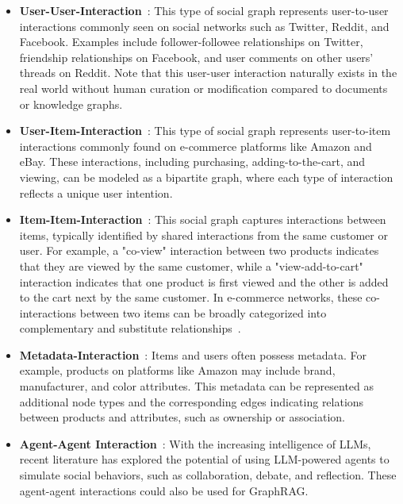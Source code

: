 \begin{itemize}[leftmargin=*]
    \item \textbf{User-User-Interaction}~\cite{jiang2023social}: This type of social graph represents user-to-user interactions commonly seen on social networks such as Twitter, Reddit, and Facebook. Examples include follower-followee relationships on Twitter, friendship relationships on Facebook, and user comments on other users' threads on Reddit. Note that this user-user interaction naturally exists in the real world without human curation or modification compared to documents or knowledge graphs.

    \item \textbf{User-Item-Interaction}~\cite{wang2024knowledge2, wang2024augmenting, xie2023factual, kim2020retrieval}: This type of social graph represents user-to-item interactions commonly found on e-commerce platforms like Amazon and eBay. These interactions, including purchasing, adding-to-the-cart, and viewing, can be modeled as a bipartite graph, where each type of interaction reflects a unique user intention.

    \item \textbf{Item-Item-Interaction}~\cite{wang2024knowledge2, zhang2021learning, wu2024stark}: This social graph captures interactions between items, typically identified by shared interactions from the same customer or user. For example, a "co-view" interaction between two products indicates that they are viewed by the same customer, while a "view-add-to-cart" interaction indicates that one product is first viewed and the other is added to the cart next by the same customer. In e-commerce networks, these co-interactions between two items can be broadly categorized into complementary and substitute relationships~\cite{zhao2024recommender}.

    \item \textbf{Metadata-Interaction}~\cite{wu2024stark, yang2024common}: Items and users often possess metadata. For example, products on platforms like Amazon may include brand, manufacturer, and color attributes. This metadata can be represented as additional node types and the corresponding edges indicating relations between products and attributes, such as ownership or association.

    \item \textbf{Agent-Agent Interaction}~\cite{chen2023agentverse, zhang2023exploring}: With the increasing intelligence of LLMs, recent literature has explored the potential of using LLM-powered agents to simulate social behaviors, such as collaboration, debate, and reflection. These agent-agent interactions could also be used for GraphRAG.
    
\end{itemize}


